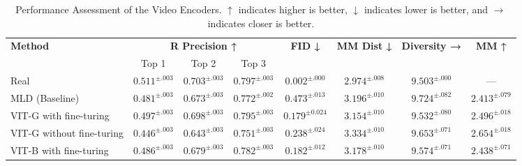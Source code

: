 \documentclass[a4paper,12pt]{article}
\begin{document}
\begin{table}[t]
\centering
\tiny
\renewcommand{\arraystretch}{1.1}
\begin{tabular}{l|ccc|c|c|c|c}
\toprule
\multirow{2}{*}{\textbf{Method}} & \multicolumn{3}{c|}{\textbf{R Precision ↑}} & \multirow{2}{*}{\textbf{FID ↓}} & \multirow{2}{*}{\textbf{MM Dist ↓}} & \multirow{2}{*}{\textbf{Diversity →}} & \multirow{2}{*}{\textbf{MM ↑}} \\
 & Top 1 & Top 2 & Top 3 &  &  &  & \\
\midrule
Real             & $0.511^{\pm.003}$ & $0.703^{\pm.003}$ & $0.797^{\pm.003}$ & $0.002^{\pm.000}$ & $2.974^{\pm.008}$ & $9.503^{\pm.000}$ & --- \\ \midrule
MLD (Baseline)   & $0.481^{\pm.003}$ & $0.673^{\pm.003}$ & $0.772^{\pm.002}$ & $0.473^{\pm.013}$ & $3.196^{\pm.010}$ & $9.724^{\pm.082}$ & $2.413^{\pm.079}$ \\ 
VIT-G with fine-turing  & $0.497^{\pm.003}$ & $0.698^{\pm.003}$  & $0.795^{\pm.003}$ &  $0.179^{\pm 0.024}$  & $3.154^{\pm.010}$  & $9.532^{\pm.080}$ &  $2.496^{\pm.018}$  \\
VIT-G without fine-turing    & $0.446^{\pm.003}$ & $0.643^{\pm.003}$ & $0.751^{\pm.003}$ & $0.238^{\pm.024}$ & $3.334^{\pm.010}$ & $9.653^{\pm.071}$ & $2.654^{\pm.018}$ \\ 
VIT-B with fine-turing    & $0.486^{\pm.003}$ & $0.679^{\pm.003}$ & $0.782^{\pm.003}$ & $0.182^{\pm.012}$ & $3.178^{\pm.010}$ & $9.574^{\pm.071}$ & $2.438^{\pm.071}$ \\

\bottomrule
\end{tabular}
\caption{Performance Assessment of the Video Encoders.
$\uparrow$ indicates higher is better, $\downarrow$ indicates lower is better, and $\rightarrow$ indicates closer is better.}
\label{tab:video_encoder}
\end{table}

\end{document}
